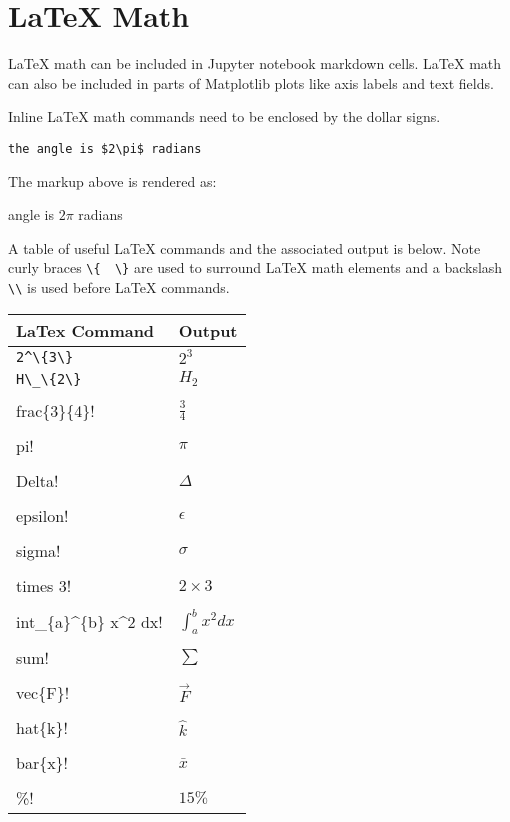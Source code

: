 \documentclass{book}
\newcommand{\passthrough}[1]{#1}
\begin{document}
    
        \hypertarget{latex-math}{%
\section{LaTeX Math}\label{latex-math}}
    




    
        LaTeX math can be included in Jupyter notebook markdown cells. LaTeX
math can also be included in parts of Matplotlib plots like axis labels
and text fields.

Inline LaTeX math commands need to be enclosed by the dollar signs.

\begin{lstlisting}
the angle is $2\pi$ radians
\end{lstlisting}

The markup above is rendered as:

angle is \(2\pi\) radians

A table of useful LaTeX commands and the associated output is below.
Note curly braces \passthrough{\lstinline!\{  \}!} are used to surround
LaTeX math elements and a backslash \passthrough{\lstinline!\\!} is used
before LaTeX commands.

\begin{longtable}[]{@{}ll@{}}
\toprule
LaTex Command & Output\tabularnewline
\midrule
\endhead
\passthrough{\lstinline!2^\{3\}!} & \(2^{3}\)\tabularnewline
\passthrough{\lstinline!H\_\{2\}!} & \(H_{2}\)\tabularnewline
\passthrough{\lstinline!\\frac\{3\}\{4\}!} &
\(\frac{3}{4}\)\tabularnewline
\passthrough{\lstinline!\\pi!} & \(\pi\)\tabularnewline
\passthrough{\lstinline!\\Delta!} & \(\Delta\)\tabularnewline
\passthrough{\lstinline!\\epsilon!} & \(\epsilon\)\tabularnewline
\passthrough{\lstinline!\\sigma!} & \(\sigma\)\tabularnewline
\passthrough{\lstinline!2 \\times 3!} & \(2 \times 3\)\tabularnewline
\passthrough{\lstinline!\\int\_\{a\}^\{b\} x^2 dx!} &
\(\int_{a}^{b} x^2 dx\)\tabularnewline
\passthrough{\lstinline!\\sum!} & \(\sum\)\tabularnewline
\passthrough{\lstinline!\\vec\{F\}!} & \(\vec{F}\)\tabularnewline
\passthrough{\lstinline!\\hat\{k\}!} & \(\hat{k}\)\tabularnewline
\passthrough{\lstinline!\\bar\{x\}!} & \(\bar{x}\)\tabularnewline
\passthrough{\lstinline!15 \\\%!} & \(15 \%\)\tabularnewline
\bottomrule
\end{longtable}
    
\end{document}
